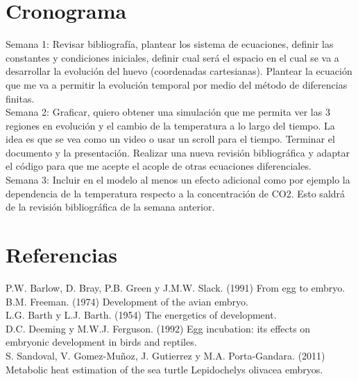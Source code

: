 \documentclass{article}
\begin{document}
\section{Cronograma}
Semana 1: Revisar bibliograf\'ia, plantear los sistema de ecuaciones, definir las constantes y condiciones iniciales, definir cual ser\'a el espacio en el cual se va a desarrollar la evoluci\'on del huevo (coordenadas cartesianas). Plantear la ecuación que me va a permitir la evolución temporal por medio del método de diferencias finitas.\\

Semana 2: Graficar, quiero obtener una simulación que me permita ver las 3 regiones en evoluci\'on y el cambio de la temperatura a lo largo del tiempo. La idea es que se vea como un video o usar un scroll para el tiempo. Terminar el documento y la presentaci\'on. Realizar una nueva revisión bibliogr\'afica y adaptar el c\'odigo para que me acepte el acople de otras ecuaciones diferenciales.\\

Semana 3: Incluir en el modelo al menos un efecto adicional como por ejemplo la dependencia de la temperatura respecto a la concentraci\'on de CO2. Esto saldr\'a de la revisi\'on bibliogr\'afica de la semana anterior.\\

\section{Referencias}
P.W. Barlow, D. Bray, P.B. Green y J.M.W. Slack. (1991) From egg to embryo.\\
B.M. Freeman. (1974) Development of the avian embryo.\\
L.G. Barth y L.J. Barth. (1954) The energetics of development.\\
D.C. Deeming y M.W.J. Ferguson. (1992) Egg incubation: its effects on embryonic development in birds and reptiles.\\
S. Sandoval, V. Gomez-Muñoz, J. Gutierrez y M.A. Porta-Gandara. (2011) Metabolic heat estimation of the sea turtle Lepidochelys olivacea embryos.\\
\end{document}
